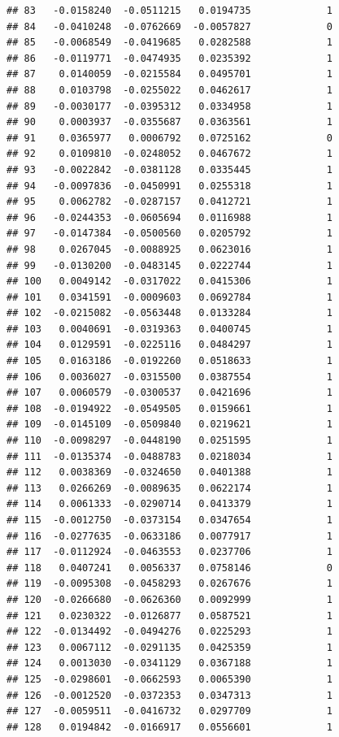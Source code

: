 \documentclass[12pt]{article}\usepackage[]{graphicx}\usepackage[]{xcolor}
\makeatletter
\newenvironment{kframe}{%
 \def\at@end@of@kframe{}%
 \ifinner\ifhmode%
  \def\at@end@of@kframe{\end{minipage}}%
  \begin{minipage}{\columnwidth}%
 \fi\fi%
 \def\FrameCommand##1{\hskip\@totalleftmargin \hskip-\fboxsep
 \colorbox{shadecolor}{##1}\hskip-\fboxsep
     \hskip-\linewidth \hskip-\@totalleftmargin \hskip\columnwidth}%
 \MakeFramed {\advance\hsize-\width
   \@totalleftmargin\z@ \linewidth\hsize
   \@setminipage}}%
 {\par\unskip\endMakeFramed%
 \at@end@of@kframe}
\newenvironment{knitrout}{}{} %
\makeatother
\begin{document}
\begin{knitrout}
\begin{kframe}
\begin{verbatim}
## 83   -0.0158240  -0.0511215   0.0194735             1
## 84   -0.0410248  -0.0762669  -0.0057827             0
## 85   -0.0068549  -0.0419685   0.0282588             1
## 86   -0.0119771  -0.0474935   0.0235392             1
## 87    0.0140059  -0.0215584   0.0495701             1
## 88    0.0103798  -0.0255022   0.0462617             1
## 89   -0.0030177  -0.0395312   0.0334958             1
## 90    0.0003937  -0.0355687   0.0363561             1
## 91    0.0365977   0.0006792   0.0725162             0
## 92    0.0109810  -0.0248052   0.0467672             1
## 93   -0.0022842  -0.0381128   0.0335445             1
## 94   -0.0097836  -0.0450991   0.0255318             1
## 95    0.0062782  -0.0287157   0.0412721             1
## 96   -0.0244353  -0.0605694   0.0116988             1
## 97   -0.0147384  -0.0500560   0.0205792             1
## 98    0.0267045  -0.0088925   0.0623016             1
## 99   -0.0130200  -0.0483145   0.0222744             1
## 100   0.0049142  -0.0317022   0.0415306             1
## 101   0.0341591  -0.0009603   0.0692784             1
## 102  -0.0215082  -0.0563448   0.0133284             1
## 103   0.0040691  -0.0319363   0.0400745             1
## 104   0.0129591  -0.0225116   0.0484297             1
## 105   0.0163186  -0.0192260   0.0518633             1
## 106   0.0036027  -0.0315500   0.0387554             1
## 107   0.0060579  -0.0300537   0.0421696             1
## 108  -0.0194922  -0.0549505   0.0159661             1
## 109  -0.0145109  -0.0509840   0.0219621             1
## 110  -0.0098297  -0.0448190   0.0251595             1
## 111  -0.0135374  -0.0488783   0.0218034             1
## 112   0.0038369  -0.0324650   0.0401388             1
## 113   0.0266269  -0.0089635   0.0622174             1
## 114   0.0061333  -0.0290714   0.0413379             1
## 115  -0.0012750  -0.0373154   0.0347654             1
## 116  -0.0277635  -0.0633186   0.0077917             1
## 117  -0.0112924  -0.0463553   0.0237706             1
## 118   0.0407241   0.0056337   0.0758146             0
## 119  -0.0095308  -0.0458293   0.0267676             1
## 120  -0.0266680  -0.0626360   0.0092999             1
## 121   0.0230322  -0.0126877   0.0587521             1
## 122  -0.0134492  -0.0494276   0.0225293             1
## 123   0.0067112  -0.0291135   0.0425359             1
## 124   0.0013030  -0.0341129   0.0367188             1
## 125  -0.0298601  -0.0662593   0.0065390             1
## 126  -0.0012520  -0.0372353   0.0347313             1
## 127  -0.0059511  -0.0416732   0.0297709             1
## 128   0.0194842  -0.0166917   0.0556601             1

\end{verbatim}
\end{kframe}
\end{knitrout}
\end{document}
